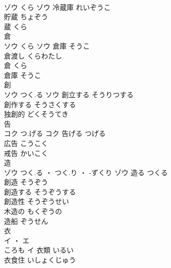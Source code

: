 \documentclass[8pt]{extreport}
\begin{document}
\begin{CJK}{UTF8}{min}
\\	ゾウ	くら	ゾウ	冷蔵庫	れいぞうこ	
\\	貯蔵	ちょぞう	
\\	蔵	くら	
\\	倉	
\\	ソウ	くら	ソウ	倉庫	そうこ	
\\	倉渡し	くらわたし	
\\	倉	くら	
\\	倉庫	そうこ	
\\	創	
\\	ソウ	つく.る	ソウ	創立する	そうりつする	
\\	創作する	そうさくする	
\\	独創的	どくそうてき	
\\	告	
\\	コク	つ.げる	コク	告げる	つげる	
\\	広告	こうこく	
\\	戒告	かいこく	
\\	造	
\\	ゾウ	つく.る ・ つく.り ・ -ずくり	ゾウ	造る	つくる	
\\	創造	そうぞう	
\\	創造する	そうぞうする	
\\	創造性	そうぞうせい	
\\	木造の	もくぞうの	
\\	造船	ぞうせん	
\\	衣	
\\	イ ・ エ
\\	ころも	イ	衣類	いるい	
\\	衣食住	いしょくじゅう	
\end{CJK}
\end{document}
